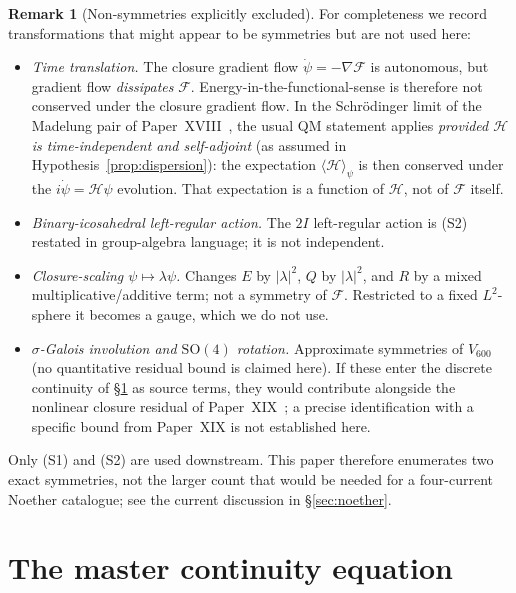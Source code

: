 \documentclass[11pt]{article}
\theoremstyle{definition}
\newtheorem{remark}[theorem]{Remark}
\newcommand{\Fcal}{\mathcal{F}}
\newcommand{\Hcal}{\mathcal{H}}
\begin{document}
\begin{remark}[Non-symmetries explicitly excluded]\label{rem:non-symmetries}
For completeness we record transformations that might appear to be symmetries but are not used here:
\begin{itemize}
    \item \emph{Time translation.} The closure gradient flow $\dot\psi = -\nabla\Fcal$ is autonomous, but gradient flow \emph{dissipates} $\Fcal$. Energy-in-the-functional-sense is therefore not conserved under the closure gradient flow. In the Schr\"{o}dinger limit of the Madelung pair of Paper~XVIII~\citep{SmartXVIII}, the usual QM statement applies \emph{provided $\Hcal$ is time-independent and self-adjoint} (as assumed in Hypothesis~\ref{prop:dispersion}): the expectation $\langle \Hcal \rangle_\psi$ is then conserved under the $i\dot\psi = \Hcal\psi$ evolution. That expectation is a function of $\Hcal$, not of $\Fcal$ itself.
    \item \emph{Binary-icosahedral left-regular action.} The $2I$ left-regular action is (S2) restated in group-algebra language; it is not independent.
    \item \emph{Closure-scaling $\psi \mapsto \lambda \psi$.} Changes $E$ by $|\lambda|^2$, $Q$ by $|\lambda|^2$, and $R$ by a mixed multiplicative/additive term; not a symmetry of $\Fcal$. Restricted to a fixed $L^2$-sphere it becomes a gauge, which we do not use.
    \item \emph{$\sigma$-Galois involution and $\mathrm{SO}(4)$ rotation.} Approximate symmetries of $V_{600}$ (no quantitative residual bound is claimed here). If these enter the discrete continuity of \S\ref{sec:continuity} as source terms, they would contribute alongside the nonlinear closure residual of Paper~XIX~\citep{SmartXIX}; a precise identification with a specific bound from Paper~XIX is not established here.
\end{itemize}
Only (S1) and (S2) are used downstream. This paper therefore enumerates two exact symmetries, not the larger count that would be needed for a four-current Noether catalogue; see the current discussion in \S\ref{sec:noether}.
\end{remark}

\section{The master continuity equation}\label{sec:continuity}
\end{document}
